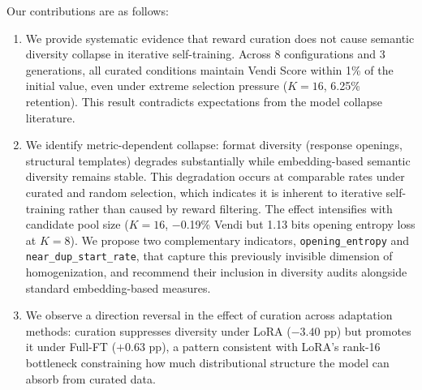 Our contributions are as follows:
\begin{enumerate}
    \item We provide systematic evidence that reward curation does not cause semantic diversity collapse in iterative self-training. Across 8 configurations and 3 generations, all curated conditions maintain Vendi Score within 1\% of the initial value, even under extreme selection pressure ($K{=}16$, 6.25\% retention). This result contradicts expectations from the model collapse literature.
    \item We identify metric-dependent collapse: format diversity (response openings, structural templates) degrades substantially while embedding-based semantic diversity remains stable. This degradation occurs at comparable rates under curated and random selection, which indicates it is inherent to iterative self-training rather than caused by reward filtering. The effect intensifies with candidate pool size ($K{=}16$, $-$0.19\% Vendi but 1.13 bits opening entropy loss at $K{=}8$). We propose two complementary indicators, \texttt{opening\_entropy} and \texttt{near\_dup\_start\_rate}, that capture this previously invisible dimension of homogenization, and recommend their inclusion in diversity audits alongside standard embedding-based measures.
    \item We observe a direction reversal in the effect of curation across adaptation methods: curation suppresses diversity under LoRA ($-3.40$ pp) but promotes it under Full-FT ($+0.63$ pp), a pattern consistent with LoRA's rank-16 bottleneck constraining how much distributional structure the model can absorb from curated data.
\end{enumerate}
